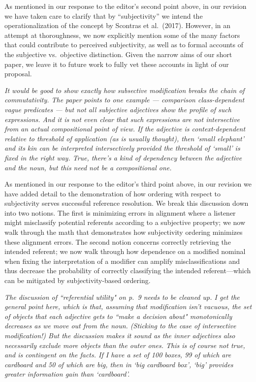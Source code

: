 \documentclass[12pt]{article}
\begin{document}
As mentioned in our response to the editor's second point above, in our revision we have taken care to clarify that by ``subjectivity'' we intend the operationalization of the concept by Scontras et al.~(2017). However, in an attempt at thoroughness, we now explicitly mention some of the many factors that could contribute to perceived subjectivity, as well as to formal accounts of the subjective vs.~objective distinction. Given the narrow aims of our short paper, we leave it to future work to fully vet these accounts in light of our proposal.


\item \emph{It would be good to show exactly how subsective modification breaks the chain of commutativity.  The paper points to one example --- comparison
class-dependent vague predicates --- but not all subjective adjectives show
the profile of such expressions.  And it is not even clear that such
expressions are not intersective from an actual compositional point of view.
If the adjective is context-dependent relative to threshold of application
(as is usually thought), then `small elephant' and its kin can be
interpreted intersectively provided the threshold of `small' is fixed in the
right way.  True, there's a kind of dependency between the adjective and the
noun, but this need not be a compositional one.}

As mentioned in our response to the editor's third point above, in our revision we have added detail to the demonstration of how ordering with respect to subjectivity serves successful reference resolution. We break this discussion down into two notions. The first is minimizing errors in alignment where a listener might misclassify potential referents according to a subjective property; we now walk through the math that demonstrates how subjectivity ordering minimizes these alignment errors. The second notion concerns correctly retrieving the intended referent; we now walk through how dependence on a modified nominal when fixing the interpretation of a modifier can amplify misclassifications and thus decrease the probability of correctly classifying the intended referent---which can be mitigated by subjectivity-based ordering.


\item \emph{The discussion of ``referential utility" on p.~9 needs to be cleaned up. I get the general point here, which is that, assuming that modification
isn't vacuous, the set of objects that each adjective gets to ``make a
decision about" monotonically decreases as we move out from the noun. 
(Sticking to the case of intersective modification!)  But the discussion
makes it sound as the inner adjectives also necessarily exclude more objects
than the outer ones.  This is of course not true, and is contingent on the
facts.  If I have a set of 100 boxes, 99 of which are cardboard and 50 of
which are big, then in `big cardboard box', `big' provides greater
information gain than `cardboard'.}
\end{document}
